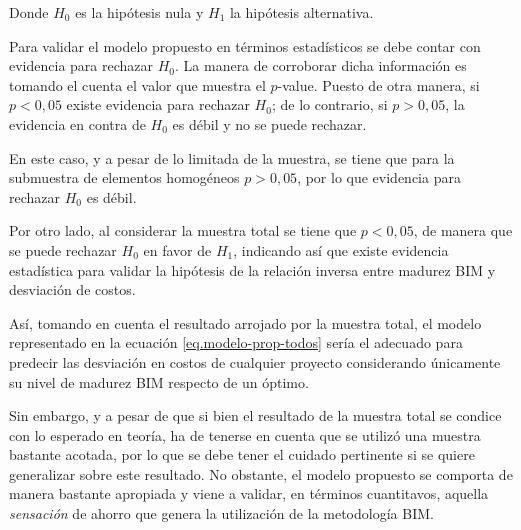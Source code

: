 Donde $H_0$ es la hipótesis nula y $H_1$ la hipótesis alternativa. 

Para validar el modelo propuesto en términos estadísticos se debe contar con evidencia para rechazar $H_0$. La manera de corroborar dicha información es tomando el cuenta el valor que muestra el $p$-value. Puesto de otra manera, si $p<0,05$ existe evidencia para rechazar $H_0$; de lo contrario, si $p>0,05$, la evidencia en contra de $H_0$ es débil y no se puede rechazar. 

En este caso, y a pesar de lo limitada de la muestra, se tiene que para la submuestra de elementos homogéneos $p>0,05$, por lo que evidencia para rechazar $H_0$ es débil.

Por otro lado, al considerar la muestra total se tiene que $p<0,05$, de manera que se puede rechazar $H_0$ en favor de $H_1$, indicando así que existe evidencia estadística para validar la hipótesis de la relación inversa entre madurez BIM y desviación de costos.

Así, tomando en cuenta el resultado arrojado por la muestra total, el modelo representado en la ecuación \eqref{eq.modelo-prop-todos} sería el adecuado para predecir las desviación en costos de cualquier proyecto considerando únicamente su nivel de madurez BIM respecto de un óptimo. 

Sin embargo, y a pesar de que si bien el resultado de la muestra total se condice con lo esperado en teoría, ha de tenerse en cuenta que se utilizó una muestra bastante acotada, por lo que se debe tener el cuidado pertinente si se quiere generalizar sobre este resultado. No obstante, el modelo propuesto se comporta de manera bastante apropiada y viene a validar, en términos cuantitavos, aquella \emph{sensación} de ahorro que genera la utilización de la metodología BIM.
